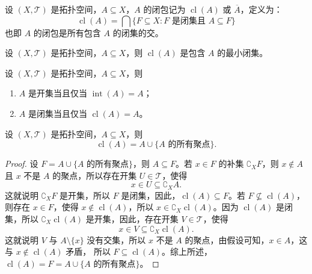 \begin{definition}
    设 $(X,\mathcal{T})$ 是拓扑空间，$A\subseteq X$，$A$ 的闭包记为 $\operatorname{cl}(A)$ 或 $\overline{A}$，定义为：
    \[
        \operatorname{cl}(A) = \bigcap \{F \subseteq X : F \text{ 是闭集且 } A \subseteq F\}
    \]
    也即 $A$ 的闭包是所有包含 $A$ 的闭集的交。
    \label{def:set_closure}
\end{definition}

\begin{proposition}
    设 $(X,\mathcal{T})$ 是拓扑空间，$A\subseteq X$，则 $\operatorname{cl}(A)$ 是包含 $A$ 的最小闭集。
\end{proposition}
\vspace{1em}

\begin{proposition}[开集和闭集判定的充要条件]
    设 $(X,\mathcal{T})$ 是拓扑空间，$A\subseteq X$，则
    \begin{enumerate}
        \item $A$ 是开集当且仅当 $\operatorname{int}(A) = A$；
        \item $A$ 是闭集当且仅当 $\operatorname{cl}(A) = A$。
    \end{enumerate}
    \label{prop:open_closed_set_criteria_1}
\end{proposition}

\begin{proposition}[集合内部与闭包的关系]
    设 $(X,\mathcal{T})$ 是拓扑空间，$A\subseteq X$，则
    \[
        \operatorname{cl}(A) = A \cup \{\text{$A$ 的所有聚点}\}.
    \]
\end{proposition}

\begin{proof}
    设 $F = A \cup \{\text{$A$ 的所有聚点}\}$，则 $A \subseteq F$。若 $x \in F$ 的补集 $\complement_X F$，则 $x \notin A$ 且 $x$ 不是 $A$ 的聚点，所以存在开集 $U \in \mathcal{T}$，使得
    \[
        x \in U \subseteq \complement_X A.
    \]
    这就说明 $\complement_X F$ 是开集，所以 $F$ 是闭集，因此，$\operatorname{cl}(A) \subseteq F$。若 $F \not\subseteq \operatorname{cl}(A)$，则存在 $x \in F$，使得 $x \notin \operatorname{cl}(A)$，所以 $x \in \complement_X \operatorname{cl}(A)$。因为 $\operatorname{cl}(A)$ 是闭集，所以 $\complement_X \operatorname{cl}(A)$ 是开集，因此，存在开集 $V \in \mathcal{T}$，使得
    \[
        x \in V \subseteq \complement_X \operatorname{cl}(A).
    \]
    这就说明 $V$ 与 $A\setminus\{x\}$ 没有交集，所以 $x$ 不是 $A$ 的聚点，由假设可知，$x\in A$，这与 $x\notin \operatorname{cl}(A)$ 矛盾，
    所以 $F \subseteq \operatorname{cl}(A)$。综上所述，$\operatorname{cl}(A) = F = A \cup \{\text{$A$ 的所有聚点}\}$。
\end{proof}
\vspace{1em}

